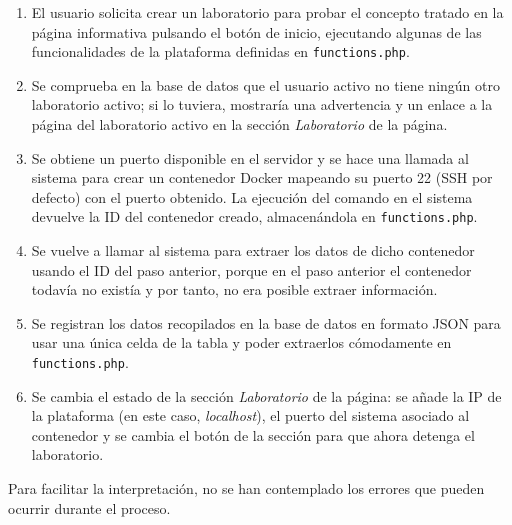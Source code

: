             \begin{enumerate}
                \item El usuario solicita crear un laboratorio para probar el concepto tratado en la página informativa pulsando el botón de inicio, ejecutando algunas de las funcionalidades de la plataforma definidas en \texttt{functions.php}.

                \item Se comprueba en la base de datos que el usuario activo no tiene ningún otro laboratorio activo; si lo tuviera, mostraría una advertencia y un enlace a la página del laboratorio activo en la sección \textit{Laboratorio} de la página.

                \item Se obtiene un puerto disponible en el servidor y se hace una llamada al sistema para crear un contenedor Docker mapeando su puerto 22 (SSH por defecto) con el puerto obtenido. La ejecución del comando en el sistema devuelve la ID del contenedor creado, almacenándola en \texttt{functions.php}.

                \item Se vuelve a llamar al sistema para extraer los datos de dicho contenedor usando el ID del paso anterior, porque en el paso anterior el contenedor todavía no existía y por tanto, no era posible extraer información.
                
                \item Se registran los datos recopilados en la base de datos en formato JSON para usar una única celda de la tabla y poder extraerlos cómodamente en \texttt{functions.php}.

                \item Se cambia el estado de la sección \textit{Laboratorio} de la página: se añade la IP de la plataforma (en este caso, \textit{localhost}), el puerto del sistema asociado al contenedor y se cambia el botón de la sección para que ahora detenga el laboratorio.
            \end{enumerate}

            Para facilitar la interpretación, no se han contemplado los errores que pueden ocurrir durante el proceso.
            
            \newpage

